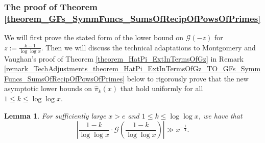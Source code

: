\documentclass[11pt,reqno,a4letter]{article}
\numberwithin{figure}{section}
\numberwithin{table}{section}
\theoremstyle{plain}
\newtheorem{lemma}[theorem]{Lemma}
\numberwithin{theorem}{section}
\theoremstyle{definition}
\newcommand{\NBRef}[1]{}
\begin{document}
\subsubsection{The proof of Theorem \ref{theorem_GFs_SymmFuncs_SumsOfRecipOfPowsOfPrimes}} 

We will first prove the stated form of the lower bound on 
$\mathcal{G}(-z)$ for $z := \frac{k-1}{\log\log x}$. 
Then we will discuss the technical adaptations to Montgomery and Vaughan's proof of 
Theorem \ref{theorem_HatPi_ExtInTermsOfGz} in 
Remark \ref{remark_TechAdjustments_theorem_HatPi_ExtInTermsOfGz_TO_GFs_SymmFuncs_SumsOfRecipOfPowsOfPrimes} 
below to rigorously prove that the new asymptotic lower bounds on $\widehat{\pi}_k(x)$ that hold uniformly for all 
$1 \leq k \leq \log\log x$. 

\NBRef{A06-2020-04-26} 
\begin{lemma} 
\label{lemma_theorem_HatPi_ExtInTermsOfGz} 
For sufficiently large $x > e$ and $1 \leq k \leq \log\log x$, we have that 
\[
\left\lvert \frac{1-k}{\log\log x} \cdot 
     \mathcal{G}\left(\frac{1-k}{\log\log x}\right) \right\rvert 
     \gg x^{-\frac{1}{4}}. 
\]
\end{lemma} 
\end{document}
